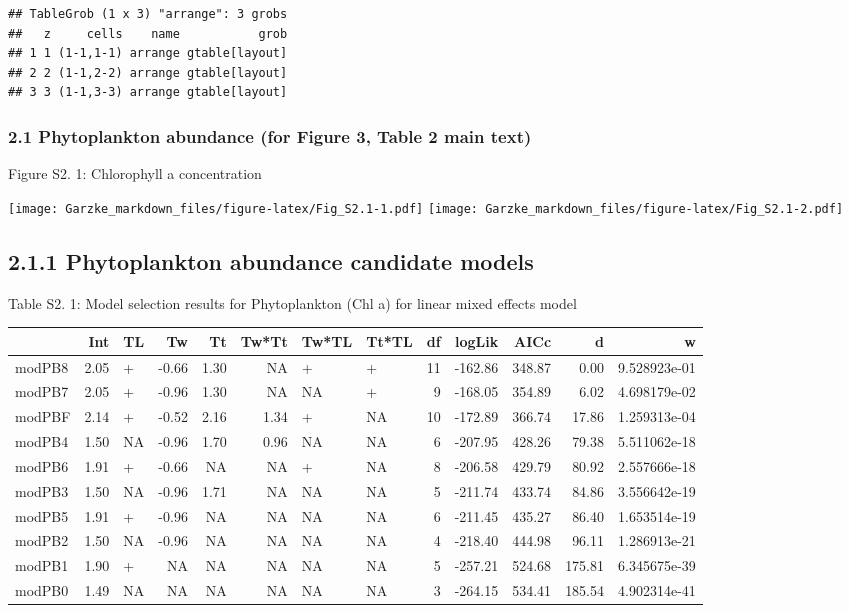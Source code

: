 \documentclass[]{article}
\begin{document}
\begin{verbatim}
## TableGrob (1 x 3) "arrange": 3 grobs
##   z     cells    name           grob
## 1 1 (1-1,1-1) arrange gtable[layout]
## 2 2 (1-1,2-2) arrange gtable[layout]
## 3 3 (1-1,3-3) arrange gtable[layout]
\end{verbatim}

\subsubsection{2.1 Phytoplankton abundance (for Figure 3, Table 2 main
text)}\label{phytoplankton-abundance-for-figure-3-table-2-main-text}

Figure S2. 1: Chlorophyll a concentration

\texttt{[image: Garzke\_markdown\_files/figure-latex/Fig\_S2.1-1.pdf]}
\texttt{[image: Garzke\_markdown\_files/figure-latex/Fig\_S2.1-2.pdf]}

\subsection{2.1.1 Phytoplankton abundance candidate
models}\label{phytoplankton-abundance-candidate-models}

Table S2. 1: Model selection results for Phytoplankton (Chl a) for
linear mixed effects model

\begin{longtable}[]{@{}lrlrrrllrrrrr@{}}
\toprule
& Int & TL & Tw & Tt & Tw*Tt & Tw*TL & Tt*TL & df & logLik & AICc & d &
w\tabularnewline
\midrule
\endhead
modPB8 & 2.05 & + & -0.66 & 1.30 & NA & + & + & 11 & -162.86 & 348.87 &
0.00 & 9.528923e-01\tabularnewline
modPB7 & 2.05 & + & -0.96 & 1.30 & NA & NA & + & 9 & -168.05 & 354.89 &
6.02 & 4.698179e-02\tabularnewline
modPBF & 2.14 & + & -0.52 & 2.16 & 1.34 & + & NA & 10 & -172.89 & 366.74
& 17.86 & 1.259313e-04\tabularnewline
modPB4 & 1.50 & NA & -0.96 & 1.70 & 0.96 & NA & NA & 6 & -207.95 &
428.26 & 79.38 & 5.511062e-18\tabularnewline
modPB6 & 1.91 & + & -0.66 & NA & NA & + & NA & 8 & -206.58 & 429.79 &
80.92 & 2.557666e-18\tabularnewline
modPB3 & 1.50 & NA & -0.96 & 1.71 & NA & NA & NA & 5 & -211.74 & 433.74
& 84.86 & 3.556642e-19\tabularnewline
modPB5 & 1.91 & + & -0.96 & NA & NA & NA & NA & 6 & -211.45 & 435.27 &
86.40 & 1.653514e-19\tabularnewline
modPB2 & 1.50 & NA & -0.96 & NA & NA & NA & NA & 4 & -218.40 & 444.98 &
96.11 & 1.286913e-21\tabularnewline
modPB1 & 1.90 & + & NA & NA & NA & NA & NA & 5 & -257.21 & 524.68 &
175.81 & 6.345675e-39\tabularnewline
modPB0 & 1.49 & NA & NA & NA & NA & NA & NA & 3 & -264.15 & 534.41 &
185.54 & 4.902314e-41\tabularnewline
\bottomrule
\end{longtable}
\end{document}
